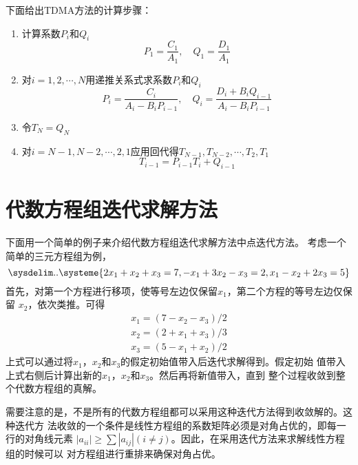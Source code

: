 下面给出TDMA方法的计算步骤：
\begin{enumerate}
  \item 计算系数$P_{i}$和$Q_{i}$
    \begin{equation*}
      P_{1} = \frac{C_{1}}{A_{1}}, \quad Q_{1} = \frac{D_{1}}{A_{1}}
    \end{equation*}
  \item 对$i=1,2,\cdots,N$用递推关系式求系数$P_{i}$和$Q_{i}$
    \begin{equation*}
      P_{i} 
      =
      \frac{C_{i}}{A_{i}-B_{i}P_{i-1}}
      ,\quad
      Q_{i}
      =
      \frac{D_{i}+B_{i}Q_{i-1}}{A_{i}-B_{i}P_{i-1}}
    \end{equation*}
  \item 令$T_{N}=Q_{N}$
  \item 对$i=N-1,N-2,\cdots,2,1$应用回代得$T_{N-1},T_{N-2},\cdots,T_{2},T_{1}$
    \begin{equation*}
      T_{i-1}=P_{i-1}T_{i} + Q_{i-1}
    \end{equation*}
\end{enumerate}

\section{代数方程组迭代求解方法}
下面用一个简单的例子来介绍代数方程组迭代求解方法中点迭代方法。
考虑一个简单的三元方程组为例，
\begin{equation}
  \sysdelim..
  \systeme{
    2x_{1} + x_{2} + x_{3} = 7,
    -x_{1} + 3x_{2} -x_{3} = 2,
    x_{1} - x_{2} + 2x_{3} = 5
  }
\end{equation}
首先，对第一个方程进行移项，使等号左边仅保留$x_{1}$，第二个方程的等号左边仅保留
$x_{2}$，依次类推。可得
\begin{equation}
\begin{aligned}
    x_{1} =(7-x_{2}-x_{3})/2 \\
    x_{2} =(2 +x_{1} +x_{3} )/ 3 \\
    x_{3} =(5- x_{1} + x_{2} )/ 2
\end{aligned}
\label{EqLA_pointiteration}
\end{equation}
上式可以通过将$x_{1}$，$x_{2}$和$x_{3}$的假定初始值带入后迭代求解得到。假定初始
值带入上式右侧后计算出新的$x_{1}$，$x_{2}$和$x_{3}$。然后再将新值带入，直到
整个过程收敛到整个代数方程组的真解。

需要注意的是，不是所有的代数方程组都可以采用这种迭代方法得到收敛解的。这种迭代方
法收敛的一个条件是线性方程组的系数矩阵必须是对角占优的，即每一行的对角线元素
$|a_{ii}|\ge \sum |a_{ij}|(i\ne j)$。因此，在采用迭代方法来求解线性方程组的时候可以
对方程组进行重排来确保对角占优。

